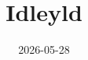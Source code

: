 \documentclass[10pt, twoside]{report}
\begin{document}
\title{Idleyld}
\date{2026-05-28}
\maketitle
\newcommand\chapterColor{MidnightBlue}

\tableofcontents
\clearpage
\renewcommand\chapterColor{BrickRed}

\renewcommand\chapterColor{MidnightBlue}

\end{document}

